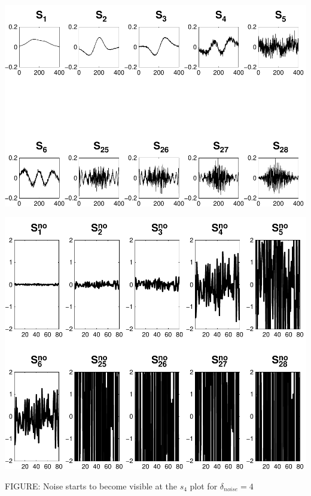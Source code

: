 \documentclass[11pt]{amsart}
\begin{document}
	\vspace{10mm}
	\begin{minipage}[t]{0.5\textwidth}
	
		\includegraphics[width=.95\linewidth]{figures/run4/sk_plots} 
   
	\end{minipage}
	\begin{minipage}[t]{0.5\textwidth}
	
		\includegraphics[width=.75\linewidth]{figures/run4/noise_parts} 
   
	\end{minipage}
	\begin{center}
		FIGURE: 
		Noise starts to become visible at the $s_{4}$ plot for $\delta_{noise}=4$	\end{center} 
	\vspace{10mm}
	
\end{document}
